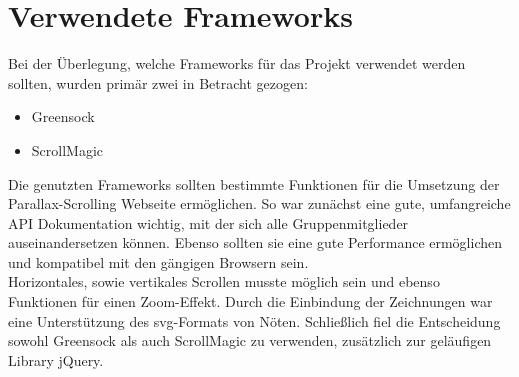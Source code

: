 \chapter{Verwendete Frameworks\label{cha:context}}
Bei der Überlegung, welche Frameworks für das Projekt verwendet werden sollten, wurden primär zwei in Betracht gezogen:
\begin{itemize}
\item Greensock
\item ScrollMagic
\end{itemize}

Die genutzten Frameworks sollten bestimmte Funktionen für die Umsetzung der Parallax-Scrolling Webseite ermöglichen. So war zunächst eine gute, umfangreiche API Dokumentation wichtig, mit der sich alle Gruppenmitglieder auseinandersetzen können. Ebenso sollten sie eine gute Performance ermöglichen und kompatibel mit den gängigen Browsern sein. \\
Horizontales, sowie vertikales Scrollen musste möglich sein und ebenso Funktionen für einen Zoom-Effekt. Durch die Einbindung der Zeichnungen war eine Unterstützung des svg-Formats von Nöten.
Schließlich fiel die Entscheidung sowohl Greensock als auch ScrollMagic zu verwenden, zusätzlich zur geläufigen Library jQuery.

	
	\newpage
	
	
	
	